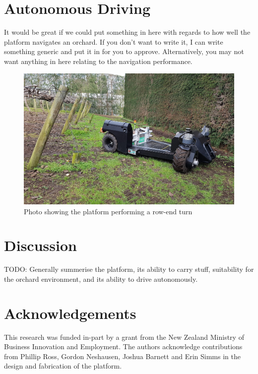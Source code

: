 \documentclass[preprint,authoryear,12pt]{elsarticle}
\begin{document}
\section{Autonomous Driving}
\label{sect:autonomous}
    \color{red}
        It would be great if we could put something in here with regards to how well the platform navigates an orchard.
        If you don't want to write it, I can write something generic and put it in for you to approve.
        Alternatively, you may not want anything in here relating to the navigation performance.
    \color{black}
    \begin{figure}[htb]
        \centering
        \includegraphics[width=\linewidth]{imgs/photos/suzy_turning.jpg}
        \caption{
            Photo showing the platform performing a row-end turn
        }
        \label{fig:suzy_turning}
    \end{figure}

\section{Discussion}
    TODO: Generally summerise the platform, its ability to carry stuff, suitability for the orchard environment, and its ability to drive autonomously.

\section*{Acknowledgements}
This research was funded in-part by a grant from the New Zealand Ministry of Business Innovation and Employment.
The authors acknowledge contributions from Phillip Ross, Gordon Neshausen, Joshua Barnett and Erin Simms in the design and fabrication of the platform.
\end{document}
